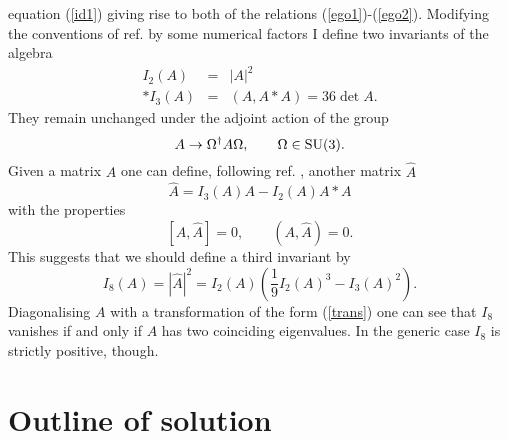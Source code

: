 \documentclass[a4paper,12pt]{article}
\begin{document}
equation (\ref{id1}) giving rise to both of the relations
(\ref{ego1})-(\ref{ego2}). Modifying the conventions of ref. \cite{msw} by some
numerical factors I define two invariants of the algebra
\begin{eqnarray} 
I_2(A) &=& |A|^2 \label{inv2} \\*
I_3(A) &=& (A,A*A) = 36 \det A. \label{inv3}
\end{eqnarray}
They remain unchanged under the adjoint action of the group
\begin{equation}
A \rightarrow \Omega^{\dagger} A \Omega, \qquad \Omega \in {\rm SU(3)}.
\label{trans}
\end{equation}
Given a matrix $A$ one can define, following ref. \cite{msw}, another matrix $\widehat{A}$
\begin{equation} \label{hat}
\widehat{A} = I_3(A) A - I_2(A) A*A
\end{equation}
with the properties
$$[A,\widehat{A}] = 0, \qquad (A,\widehat{A}) = 0.$$
This suggests that we should define a third invariant by
\begin{equation} \label{inv+}
I_8(A) = |\widehat{A}|^2 = I_2(A) \left( \frac{1}{9} I_2(A)^3 - I_3(A)^2 \right).
\end{equation}
Diagonalising $A$ with a transformation of the form (\ref{trans}) one can see
that $I_8$ vanishes if and only if $A$ has two coinciding eigenvalues. In the
generic case $I_8$ is strictly positive, though.

\section{Outline of solution}
\end{document}
